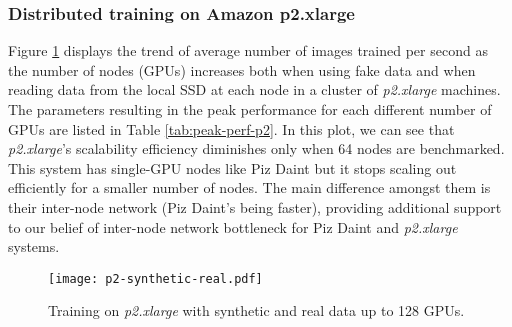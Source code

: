 \subsubsection{Distributed training on Amazon p2.xlarge}
Figure \ref{fig:p2} displays the trend of average number of images trained per second as the number of nodes (GPUs) increases both when using fake data and when reading data from the local SSD at each node in a cluster of \textit{p2.xlarge} machines.
The parameters resulting in the peak performance for each different number of GPUs are listed in Table \ref{tab:peak-perf-p2}.
In this plot, we can see that \textit{p2.xlarge}'s scalability efficiency diminishes only when 64 nodes are benchmarked.
This system has single-GPU nodes like Piz Daint but it stops scaling out efficiently for a smaller number of nodes.
The main difference amongst them is their inter-node network (Piz Daint's being faster), providing additional support to our belief of inter-node network bottleneck for Piz Daint and \textit{p2.xlarge} systems.
\begin{figure}[H]
  \centering
  \texttt{[image: p2-synthetic-real.pdf]}
  \vspace{-0.85cm}
  \caption{Training on \textit{p2.xlarge} with synthetic and real data up to 128 GPUs.}
  \label{fig:p2}
\end{figure}

